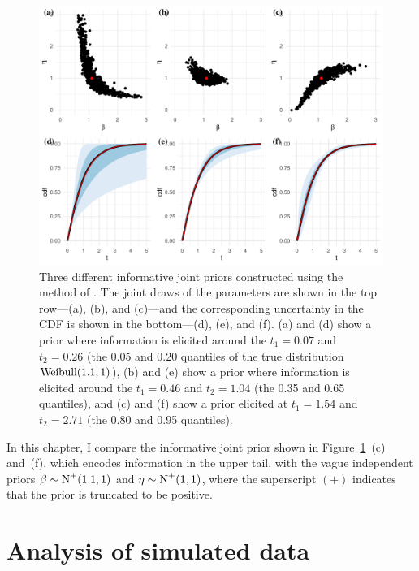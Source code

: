 \begin{figure}
    \centering
    \includegraphics[width=1\textwidth]{./figures/ch-2/joint-priors.pdf}
    \caption{Three different informative joint priors constructed using the method of \citet{kaminskiy2005}. The joint draws of the parameters are shown in the top row---(a), (b), and (c)---and the corresponding uncertainty in the CDF is shown in the bottom---(d), (e), and (f). (a) and (d) show a prior where information is elicited around the $t_1 = 0.07$ and $t_2 = 0.26$ (the 0.05 and 0.20 quantiles of the true distribution $\hbox{Weibull}(1.1, 1)$), (b) and (e) show a prior where information is elicited around the $t_1 = 0.46$ and $t_2 = 1.04$ (the 0.35 and 0.65 quantiles), and (c) and (f) show a prior elicited at $t_1 = 1.54$ and $t_2 = 2.71$ (the 0.80 and 0.95 quantiles).}
    \label{fig:kaminskiy-join-priors}
\end{figure}

In this chapter, I compare the informative joint prior shown in Figure~\ref{fig:kaminskiy-join-priors}~(c) and~(f), which encodes information in the upper tail, with the vague independent priors $\beta \sim \hbox{N}^{+}(1.1, 1)$ and $\eta \sim \hbox{N}^{+}(1, 1)$, where the superscript $(+)$ indicates that the prior is truncated to be positive. 

\section{Analysis of simulated data} \label{sec:weibull-sim-example}


